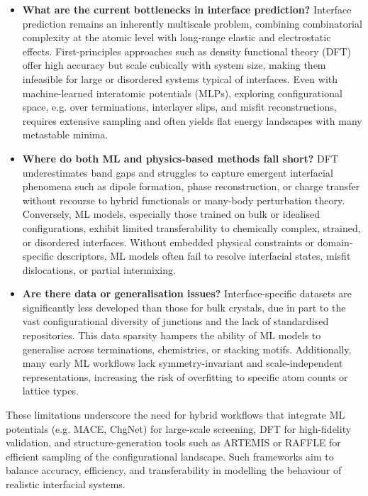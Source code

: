 \begin{itemize}
    \item \textbf{What are the current bottlenecks in interface prediction?} Interface prediction remains an inherently multiscale problem, combining combinatorial complexity at the atomic level with long-range elastic and electrostatic effects. First-principles approaches such as density functional theory (DFT) offer high accuracy but scale cubically with system size, making them infeasible for large or disordered systems typical of interfaces. Even with machine-learned interatomic potentials (MLPs), exploring configurational space, e.g. over terminations, interlayer slips, and misfit reconstructions, requires extensive sampling and often yields flat energy landscapes with many metastable minima.
    \item \textbf{Where do both ML and physics-based methods fall short?} DFT underestimates band gaps and struggles to capture emergent interfacial phenomena such as dipole formation, phase reconstruction, or charge transfer without recourse to hybrid functionals or many-body perturbation theory. Conversely, ML models, especially those trained on bulk or idealised configurations, exhibit limited transferability to chemically complex, strained, or disordered interfaces. Without embedded physical constraints or domain-specific descriptors, ML models often fail to resolve interfacial states, misfit dislocations, or partial intermixing.
    \item \textbf{Are there data or generalisation issues?} Interface-specific datasets are significantly less developed than those for bulk crystals, due in part to the vast configurational diversity of junctions and the lack of standardised repositories. This data sparsity hampers the ability of ML models to generalise across terminations, chemistries, or stacking motifs. Additionally, many early ML workflows lack symmetry-invariant and scale-independent representations, increasing the risk of overfitting to specific atom counts or lattice types.
\end{itemize} 
 
These limitations underscore the need for hybrid workflows that integrate ML potentials (e.g. MACE, ChgNet) for large-scale screening, DFT for high-fidelity validation, and structure-generation tools such as ARTEMIS or RAFFLE for efficient sampling of the configurational landscape. Such frameworks aim to balance accuracy, efficiency, and transferability in modelling the behaviour of realistic interfacial systems. 
 
